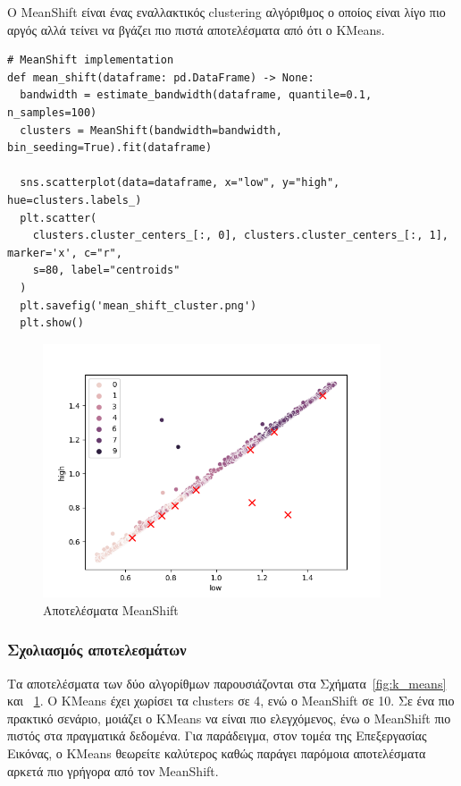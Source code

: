 Ο MeanShift είναι ένας εναλλακτικός clustering αλγόριθμος ο οποίος είναι λίγο πιο αργός αλλά τείνει να βγάζει πιο πιστά αποτελέσματα από ότι ο KMeans.

\begin{verbatim}
# MeanShift implementation
def mean_shift(dataframe: pd.DataFrame) -> None:
  bandwidth = estimate_bandwidth(dataframe, quantile=0.1, n_samples=100)
  clusters = MeanShift(bandwidth=bandwidth, bin_seeding=True).fit(dataframe)

  sns.scatterplot(data=dataframe, x="low", y="high", hue=clusters.labels_)
  plt.scatter(
    clusters.cluster_centers_[:, 0], clusters.cluster_centers_[:, 1], marker='x', c="r",
    s=80, label="centroids"
  )
  plt.savefig('mean_shift_cluster.png')
  plt.show()
\end{verbatim}

\begin{figure}[H]
  \centering
  \includegraphics[width=100mm]{Figures/mean_shift_cluster.png}
  \caption{Αποτελέσματα MeanShift}
  \label{fig:mean_shift}
\end{figure}

\subsubsection{Σχολιασμός αποτελεσμάτων}
\label{chap:results}

Τα αποτελέσματα των δύο αλγορίθμων παρουσιάζονται στα Σχήματα~\ref{fig:k_means} και ~\ref{fig:mean_shift}. Ο KMeans έχει χωρίσει τα clusters σε 4, ενώ ο MeanShift σε 10. Σε ένα πιο πρακτικό σενάριο, μοιάζει ο KMeans να είναι πιο ελεγχόμενος, ένω ο MeanShift πιο πιστός στα πραγματικά δεδομένα. Για παράδειγμα, στον τομέα της Επεξεργασίας Εικόνας, ο KMeans θεωρείτε καλύτερος καθώς παράγει παρόμοια αποτελέσματα αρκετά πιο γρήγορα από τον MeanShift.
